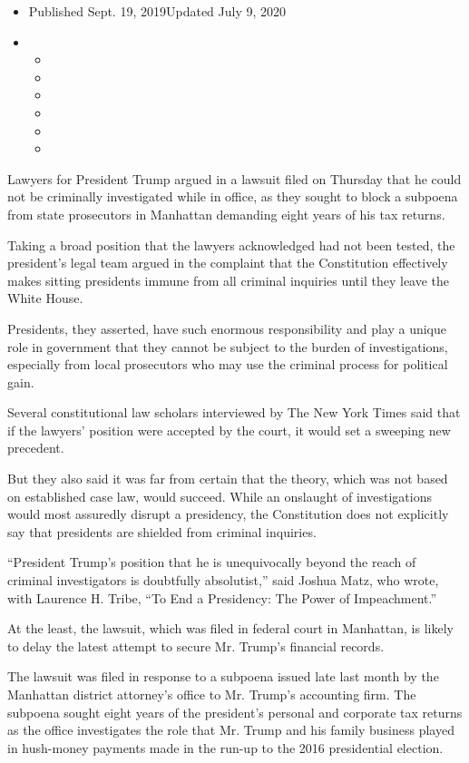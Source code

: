 \begin{itemize}
\item
  Published Sept. 19, 2019Updated July 9, 2020
\item
  \begin{itemize}
  \item
  \item
  \item
  \item
  \item
  \item
  \end{itemize}
\end{itemize}

Lawyers for President Trump argued in a lawsuit filed on Thursday that
he could not be criminally investigated while in office, as they sought
to block a subpoena from state prosecutors in Manhattan demanding eight
years of his tax returns.

Taking a broad position that the lawyers acknowledged had not been
tested, the president's legal team argued in the complaint that the
Constitution effectively makes sitting presidents immune from all
criminal inquiries until they leave the White House.

Presidents, they asserted, have such enormous responsibility and play a
unique role in government that they cannot be subject to the burden of
investigations, especially from local prosecutors who may use the
criminal process for political gain.

Several constitutional law scholars interviewed by The New York Times
said that if the lawyers' position were accepted by the court, it would
set a sweeping new precedent.

But they also said it was far from certain that the theory, which was
not based on established case law, would succeed. While an onslaught of
investigations would most assuredly disrupt a presidency, the
Constitution does not explicitly say that presidents are shielded from
criminal inquiries.

``President Trump's position that he is unequivocally beyond the reach
of criminal investigators is doubtfully absolutist,'' said Joshua Matz,
who wrote, with Laurence H. Tribe, ``To End a Presidency: The Power of
Impeachment.''

At the least, the lawsuit, which was filed in federal court in
Manhattan, is likely to delay the latest attempt to secure Mr. Trump's
financial records.

The lawsuit was filed in response to a subpoena issued late last month
by the Manhattan district attorney's office to Mr. Trump's accounting
firm. The subpoena sought eight years of the president's personal and
corporate tax returns as the office investigates the role that Mr. Trump
and his family business played in hush-money payments made in the run-up
to the 2016 presidential election.

